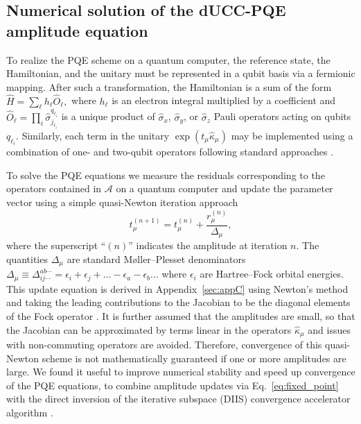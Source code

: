 \documentclass[aps,prx, reprint]{revtex4-2}
\newcommand*{\qucc}{dUCC\xspace}
\begin{document}
\subsection{Numerical solution of the \qucc-PQE amplitude equation}

To realize the PQE scheme on a quantum computer, the reference state, the Hamiltonian, and the unitary must be represented in a qubit basis via a fermionic mapping.
After such a transformation, the Hamiltonian is a sum of the form $\hat{H} = \sum_\ell h_\ell \hat{O}_\ell,$ where $h_\ell$ is an electron integral multiplied by a coefficient and $\hat{O}_\ell = \prod_{i} \hat{\sigma}_{j_{\ell_i}}^{q_{\ell_i}}$ is a unique product of $\hat{\sigma}_{x}$, $\hat{\sigma}_{y}$, or $\hat{\sigma}_{z}$  Pauli operators acting on qubits $q_{\ell_i}$.
Similarly, each term in the unitary $\exp(t_\mu \hat{\kappa}_\mu )$ may be implemented using a combination of one- and two-qubit operators following standard approaches \cite{Peruzzo:2014kca, yung2014transistor, McClean:2016bs}.

To solve the PQE equations we measure the residuals corresponding to the operators contained in $\mathcal{A}$ on a quantum computer and update the parameter vector using a simple quasi-Newton iteration approach
\begin{equation}
\label{eq:fixed_point}
t_\mu^{(n +1)} = t_\mu^{(n)} + \frac{r^{(n)}_\mu}{\Delta_\mu},
\end{equation}
where the superscript ``$(n)$'' indicates the amplitude at iteration $n$.
The quantities $\Delta_\mu$ are standard M{\o}ller--Plesset denominators $\Delta_\mu \equiv \Delta_{ij\cdots}^{ab\cdots} = \epsilon_i + \epsilon_j + \ldots -\epsilon_a -\epsilon_b \ldots$ where $\epsilon_i$ are Hartree--Fock orbital energies.
This update equation is derived in Appendix~\ref{sec:appC} using Newton's method and taking the leading contributions to the Jacobian to be the diagonal elements of the Fock operator \cite{doi:https://doi.org/10.1002/9781119019572.ch13}.
It is further assumed that the amplitudes are small, so that the Jacobian can be approximated by terms linear in the operators $\hat{\kappa}_{\mu}$ and issues with non-commuting operators are avoided.
Therefore, convergence of this quasi-Newton scheme is not mathematically guaranteed if one or more amplitudes are large.
We found it useful to improve numerical stability and speed up convergence of the PQE equations, to combine amplitude updates via Eq.~\eqref{eq:fixed_point} with the direct inversion of the iterative subspace (DIIS) convergence accelerator algorithm \cite{pulay1980convergence,SCUSERIA1986236}.
\end{document}
